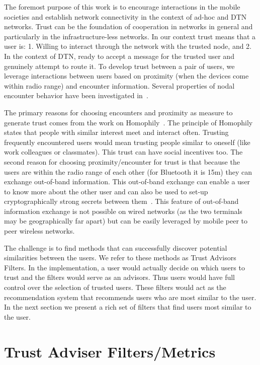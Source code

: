 \documentclass[10pt,conference]{IEEEtran}
\begin{document}
The foremost purpose of this work is to encourage interactions in the mobile societies and establish network connectivity in the context of ad-hoc and DTN networks. Trust can be the foundation of cooperation in networks in general and particularly in the infrastructure-less networks. In our context trust means that a user is: 1. Willing to interact through the network with the trusted node, and 2. In the context of DTN, ready to accept a message for the trusted user and genuinely attempt to route it.  To develop trust between a pair of users, we  leverage interactions between users based on proximity (when the devices come within radio range) and encounter information. Several properties of nodal encounter behavior have been investigated in~\cite{nodal}.


The primary reasons for choosing encounters and proximity as measure to generate trust comes from the work on Homophily~\cite{homophily}. The principle of Homophily states that people with similar interest meet and interact often. Trusting  frequently encountered users would mean trusting people similar to oneself (like work colleagues or classmates). This trust can have social incentives too. The second reason for choosing proximity/encounter for trust is that because the users are within the radio range of each other (for Bluetooth it is 15m) they can exchange out-of-band information. This out-of-band exchange can enable a user to know more about the other user and can also be used to set-up cryptographically strong secrets between them~\cite{gangs}. This feature of out-of-band information exchange is not possible on wired networks (as the two terminals may be geographically far apart) but can be easily leveraged by mobile peer to peer wireless networks.

The challenge is to find methods that can successfully discover potential similarities between the users. We refer to these methods  as Trust  Advisors Filters.  In the implementation, a user would actually decide on which users to trust and the filters would serve as an advisors. Thus users would have full control over the selection of trusted users. These filters would act as the recommendation system that recommends users who are most similar to the user. In the next section we present a rich set of filters that find users most similar to the user.



\section{Trust Adviser Filters/Metrics}  \label{trust_filter}
\end{document}
